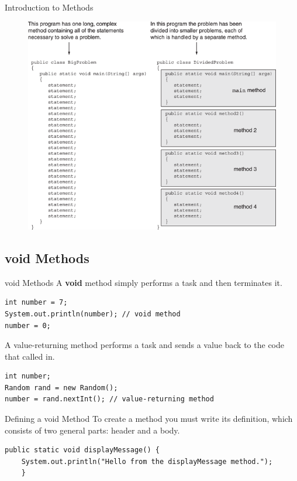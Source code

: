 \documentclass[11pt]{beamer}
\begin{document}
\begin{frame}{Introduction to Methods}
    \noindent 
    \begin{figure}[H]
    \centering
    \includegraphics[scale=0.7]{Images/chapter05_motivation.png}
    \end{figure}
\end{frame}

\subsection{void Methods}
\begin{frame}[fragile]{void Methods}
    A \textbf{void} method simply performs a task and then terminates it.
    \begin{lstlisting}
int number = 7;
System.out.println(number); // void method
number = 0;
    \end{lstlisting}
    A value-returning method performs a task and sends a value back to the code that called in.
    \begin{lstlisting}
int number;
Random rand = new Random();
number = rand.nextInt(); // value-returning method
    \end{lstlisting}
\end{frame}

\begin{frame}[fragile]{Defining a void Method}
    To create a method you must write its definition, which consists of two general parts: header and a body.
    \begin{lstlisting}
public static void displayMessage() {
    System.out.println("Hello from the displayMessage method.");
    }
    \end{lstlisting}
\end{frame}
\end{document}
